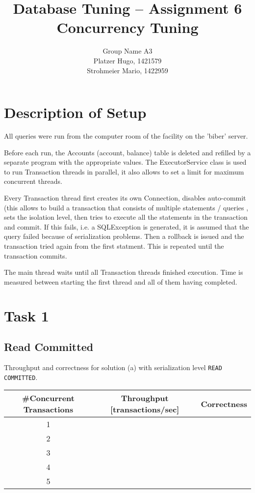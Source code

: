 \documentclass[11pt]{scrartcl}
\title{
  \textbf{\large Database Tuning -- Assignment 6}\\
  Concurrency Tuning
}
\author{
 Group Name A3\\
 \large Platzer Hugo, 1421579 \\
 \large Strohmeier Mario, 1422959
}
\begin{document}
\maketitle

\section{Description of Setup}
All queries were run from the computer room of the facility on the 'biber' server.

Before each run, the Accounts (account, balance) table is deleted and refilled
by a separate program with the appropriate values.
The ExecutorService class is used to run Transaction threads in parallel, it 
also allows to set a limit for maximum concurrent threads.

Every Transaction thread first creates its own Connection, disables auto-commit (this allows
to build a transaction that consists of multiple statements / queries
, sets the isolation level,
then tries to execute all the statements in the transaction and commit. If this fails, i.e. a SQLException
is generated, it is assumed that the query failed because of serialization problems. Then a rollback is issued
and the transaction tried again from the first statment. This is repeated until the transaction commits.

The main thread waits until all Transaction threads finished execution. Time is measured between
starting the first thread and all of them having completed.

\section*{Task 1}

\subsection*{Read Committed}

Throughput and correctness for solution (a) with serialization level
{\tt\small READ COMMITTED}.

\bigskip

\begin{tabular}{c|c|c}
  \#Concurrent Transactions & Throughput [transactions/sec] & Correctness
  \\\hline
  1 & & \\
  2 & & \\
  3 & & \\
  4 & & \\
  5 & & \\    
\end{tabular}
\end{document}
